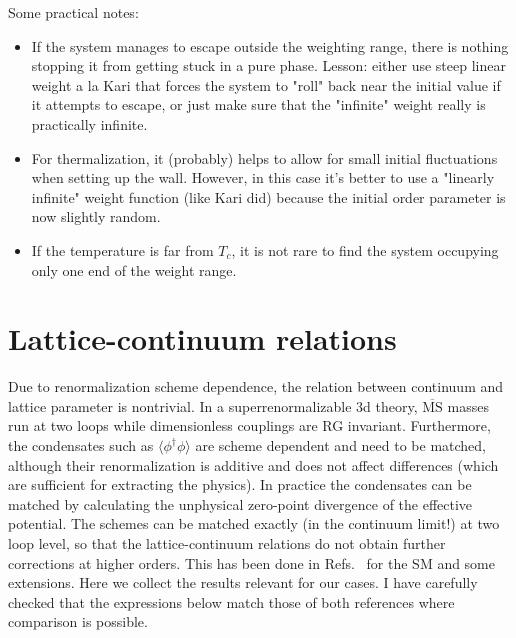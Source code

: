\documentclass[11pt,a4paper]{article}
\newcommand\MSbar{$\overline{\text{MS}}$ } %
\begin{document}
Some practical notes:
\begin{itemize}
	\item If the system manages to escape outside the weighting range, there is nothing stopping it from getting stuck in a pure phase. Lesson: either use steep linear weight a la Kari that forces the system to "roll" back near the initial value if it attempts to escape, or just make sure that the "infinite" weight really is practically infinite.

	\item For thermalization, it (probably) helps to allow for small initial fluctuations when setting up the wall. However, in this case it's better to use a "linearly infinite" weight function (like Kari did) because the initial order parameter is now slightly random.

	\item If the temperature is far from $T_c$, it is not rare to find the system occupying only one end of the weight range.
	
\end{itemize}


\appendix 

\section{Lattice-continuum relations}
\label{sec:lat-cont}

Due to renormalization scheme dependence, the relation between continuum and lattice parameter is nontrivial. In a superrenormalizable 3d theory, \MSbar masses run at two loops while dimensionless couplings are RG invariant. Furthermore, the condensates such as $\langle \phi^\dagger\phi \rangle$ are scheme dependent and need to be matched, although their renormalization is additive and does not affect differences (which are sufficient for extracting the physics). In practice the condensates can be matched by calculating the unphysical zero-point divergence of the effective potential. The schemes can be matched exactly (in the continuum limit!) at two loop level, so that the lattice-continuum relations do not obtain further corrections at higher orders. This has been done in Refs.~\cite{Laine:1995np, Laine:1997dy} for the SM and some extensions. Here we collect the results relevant for our cases. I have carefully checked that the expressions below match those of both references \cite{Laine:1995np, Laine:1997dy} where comparison is possible.
\end{document}
